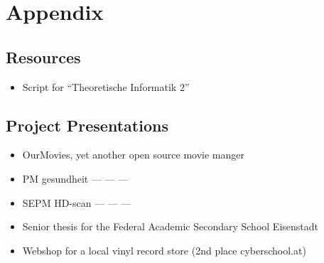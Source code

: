 
\section{Appendix}




\subsection*{Resources}

\begin{itemize}
  
    \item {}
        Script for ``Theoretische Informatik 2''
    \EndLink
 
\end{itemize}




\subsection*{Project Presentations}

\begin{itemize}
  
    \item {}
        OurMovies, yet another open source movie manger
    \EndLink
  
    \item {}
        PM gesundheit --- --- --- %
    \EndLink
  
    \item {}
        SEPM HD-scan --- --- --- %
    \EndLink
  
    \item {}
        Senior thesis for the Federal Academic Secondary School Eisenstadt
    \EndLink
  
    \item {}
        Webshop for a local vinyl record store (2nd place cyberschool.at)
    \EndLink
 
\end{itemize}


